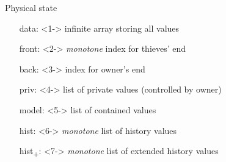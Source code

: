 \begin{frame}{Physical state}
\vfill
\begin{itemize}
	\item[data:]<1-> infinite array storing all values
	\item[front:]<2-> \emph{monotone} index for thieves' end
	\item[back:]<3-> index for owner's end
\end{itemize}
\begin{itemize}
	\item[priv:]<4-> list of private values (controlled by owner)
	\item[model:]<5-> list of contained values
	\item[hist:]<6-> \emph{monotone} list of history values
	\item[hist\textsubscript{+}:]<7-> \emph{monotone} list of extended history values
\end{itemize}
\end{frame}
